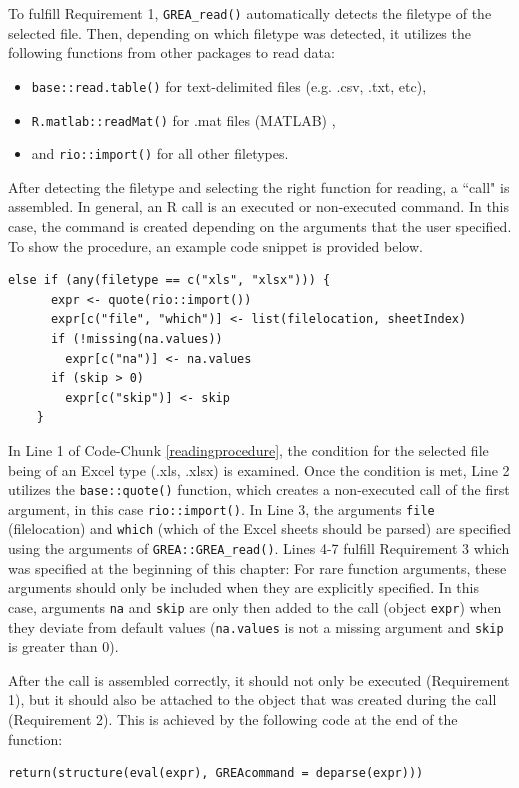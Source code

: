 \documentclass[12pt]{article} %
\newcommand{\li}{\lstinline}
\begin{document}
To fulfill Requirement 1, \li{GREA_read()} automatically detects the filetype of the selected file. Then, depending on which filetype was detected, it utilizes the following functions from other packages to read data:

\begin{itemize}
\item \li{base::read.table()} for text-delimited files (e.g. .csv, .txt, etc),
\item \li{R.matlab::readMat()} for .mat files (MATLAB) \cite[Bengtsson 2016]{w8},
\item and \li{rio::import()} for all other filetypes.
\end{itemize}

After detecting the filetype and selecting the right function for reading, a ``call" is assembled. In general, an R call is an executed or non-executed command. In this case, the command is created depending on the arguments that the user specified. To show the procedure, an example code snippet is provided below.

\begin{lstlisting}[caption = Reading procedure of \li{GREA_read()}, label = readingprocedure]
else if (any(filetype == c("xls", "xlsx"))) {
      expr <- quote(rio::import())
      expr[c("file", "which")] <- list(filelocation, sheetIndex)
      if (!missing(na.values))
        expr[c("na")] <- na.values
      if (skip > 0)
        expr[c("skip")] <- skip
    }
\end{lstlisting}

In Line 1 of Code-Chunk \ref{readingprocedure}, the condition for the selected file being of an Excel type (.xls, .xlsx) is examined. Once the condition is met, Line 2 utilizes the \li{base::quote()} function, which creates a non-executed call of the first argument, in this case \li{rio::import()}. In Line 3, the arguments \li{file} (filelocation) and \li{which} (which of the Excel sheets should be parsed) are specified using the arguments of \li{GREA::GREA_read()}. Lines 4-7 fulfill Requirement 3 which was specified at the beginning of this chapter: For rare function arguments, these arguments should only be included when they are explicitly specified. In this case, arguments \li{na} and \li{skip} are only then added to the call (object \li{expr}) when they deviate from default values (\li{na.values} is not a missing argument and \li{skip} is greater than 0).

After the call is assembled correctly, it should not only be executed (Requirement 1), but it should also be attached to the object that was created during the call (Requirement 2). This is achieved by the following code at the end of the function:
\begin{lstlisting}[caption = Return Command of the \li{GREA_read()} function, label = returnread]
return(structure(eval(expr), GREAcommand = deparse(expr)))
\end{lstlisting}
\end{document}
